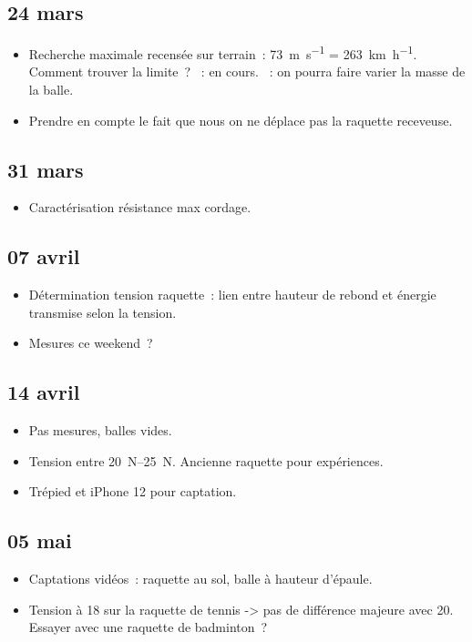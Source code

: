 \documentclass[a4paper, 11pt, final, garamond]{book}
\begin{document}
\subsection{24 mars}
\begin{itemize}
    \item Recherche maximale recensée sur terrain~: \SI{73}{m.s^{-1}} =
        \SI{263}{km.h^{-1}}. Comment trouver la limite~?
    ~: en cours.
    ~: on pourra faire varier la masse de la balle.
    \item Prendre en compte le fait que nous on ne déplace pas la raquette
        receveuse.
\end{itemize}

\subsection{31 mars}
\begin{itemize}
  ~: balle illustrant la déformation de la balle avec le cordage.
  \item Caractérisation résistance max cordage.
\end{itemize}

\subsection{07 avril}
\begin{itemize}
  \item Détermination tension raquette~: lien entre hauteur de rebond et énergie
    transmise selon la tension.
  \item Mesures ce weekend~?
\end{itemize}

\subsection{14 avril}
\begin{itemize}
  \item Pas mesures, balles vides.
  \item Tension entre \SIrange{20}{25}{N}. Ancienne raquette pour expériences.
  \item Trépied et iPhone 12 pour captation.
\end{itemize}

\subsection{05 mai}
\begin{itemize}
  \item Captations vidéos~: raquette au sol, balle à hauteur d'épaule.
  \item Tension à 18 sur la raquette de tennis -> pas de différence majeure avec
    20. Essayer avec une raquette de badminton~?
\end{itemize}
\end{document}
